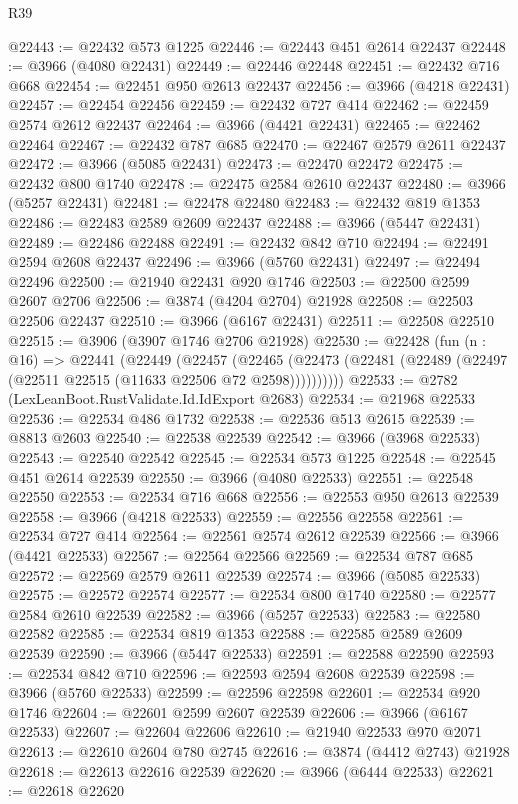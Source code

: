 \begin{lexlean}{R39}
\begin{coremodule}
@22443 := @22432 @573 @1225
@22446 := @22443 @451 @2614 @22437
@22448 := @3966 (@4080 @22431)
@22449 := @22446 @22448
@22451 := @22432 @716 @668
@22454 := @22451 @950 @2613 @22437
@22456 := @3966 (@4218 @22431)
@22457 := @22454 @22456
@22459 := @22432 @727 @414
@22462 := @22459 @2574 @2612 @22437
@22464 := @3966 (@4421 @22431)
@22465 := @22462 @22464
@22467 := @22432 @787 @685
@22470 := @22467 @2579 @2611 @22437
@22472 := @3966 (@5085 @22431)
@22473 := @22470 @22472
@22475 := @22432 @800 @1740
@22478 := @22475 @2584 @2610 @22437
@22480 := @3966 (@5257 @22431)
@22481 := @22478 @22480
@22483 := @22432 @819 @1353
@22486 := @22483 @2589 @2609 @22437
@22488 := @3966 (@5447 @22431)
@22489 := @22486 @22488
@22491 := @22432 @842 @710
@22494 := @22491 @2594 @2608 @22437
@22496 := @3966 (@5760 @22431)
@22497 := @22494 @22496
@22500 := @21940 @22431 @920 @1746
@22503 := @22500 @2599 @2607 @2706
@22506 := @3874 (@4204 @2704) @21928
@22508 := @22503 @22506 @22437
@22510 := @3966 (@6167 @22431)
@22511 := @22508 @22510
@22515 := @3906 (@3907 @1746 @2706 @21928)
@22530 := @22428
    (fun (n : @16) =>
    @22441
      (@22449
        (@22457
          (@22465 (@22473 (@22481 (@22489 (@22497 (@22511 @22515 (@11633 @22506 @72 @2598))))))))))
@22533 := @2782 (LexLeanBoot.RustValidate.Id.IdExport @2683)
@22534 := @21968 @22533
@22536 := @22534 @486 @1732
@22538 := @22536 @513 @2615
@22539 := @8813 @2603
@22540 := @22538 @22539
@22542 := @3966 (@3968 @22533)
@22543 := @22540 @22542
@22545 := @22534 @573 @1225
@22548 := @22545 @451 @2614 @22539
@22550 := @3966 (@4080 @22533)
@22551 := @22548 @22550
@22553 := @22534 @716 @668
@22556 := @22553 @950 @2613 @22539
@22558 := @3966 (@4218 @22533)
@22559 := @22556 @22558
@22561 := @22534 @727 @414
@22564 := @22561 @2574 @2612 @22539
@22566 := @3966 (@4421 @22533)
@22567 := @22564 @22566
@22569 := @22534 @787 @685
@22572 := @22569 @2579 @2611 @22539
@22574 := @3966 (@5085 @22533)
@22575 := @22572 @22574
@22577 := @22534 @800 @1740
@22580 := @22577 @2584 @2610 @22539
@22582 := @3966 (@5257 @22533)
@22583 := @22580 @22582
@22585 := @22534 @819 @1353
@22588 := @22585 @2589 @2609 @22539
@22590 := @3966 (@5447 @22533)
@22591 := @22588 @22590
@22593 := @22534 @842 @710
@22596 := @22593 @2594 @2608 @22539
@22598 := @3966 (@5760 @22533)
@22599 := @22596 @22598
@22601 := @22534 @920 @1746
@22604 := @22601 @2599 @2607 @22539
@22606 := @3966 (@6167 @22533)
@22607 := @22604 @22606
@22610 := @21940 @22533 @970 @2071
@22613 := @22610 @2604 @780 @2745
@22616 := @3874 (@4412 @2743) @21928
@22618 := @22613 @22616 @22539
@22620 := @3966 (@6444 @22533)
@22621 := @22618 @22620

\end{coremodule}
\end{lexlean}

